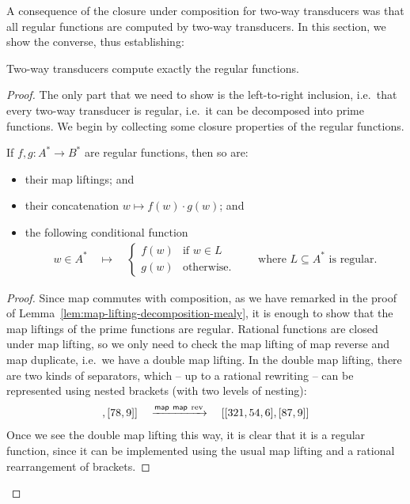 A consequence of the closure under composition for two-way transducers was that all regular functions are computed by two-way transducers. In this section, we show the converse, thus establishing:
\begin{theorem}
    \label{thm:2dfa-decomposition-into-primes}
    Two-way transducers compute exactly the regular functions. 
\end{theorem}
\begin{proof}
    The only part that we need to show is the left-to-right inclusion, i.e.~that every two-way transducer is regular, i.e.~it can be decomposed into prime functions. We begin by collecting some closure properties of the regular functions.
    \begin{lemma}
        \label{lem:regular-closure-properties}
        If $f,g : A^* \to B^*$ are regular functions, then so are: 
        \begin{itemize}
            \item their map liftings; and
            \item their concatenation $w \mapsto f(w)\cdot g(w)$; and
            \item the following conditional function
            \begin{align*}
            w \in A^* \quad \mapsto \quad
            \begin{cases}
                f(w) & \text{if $w \in L$}\\
                g(w) & \text{otherwise.}
            \end{cases}
            \qquad \text{where $L \subseteq A^*$ is regular.}
            \end{align*}
        \end{itemize}
    \end{lemma}
    \begin{proof}
        Since map commutes with composition, as we have remarked in the proof of Lemma~\ref{lem:map-lifting-decomposition-mealy}, it is enough to show that the map liftings of the prime functions are regular. Rational functions are closed under map lifting, so we only need to check the map lifting of map reverse and map duplicate, i.e.~we have a double map lifting. In the double map lifting, there are two kinds of separators, which -- up to a rational rewriting -- can be represented using nested brackets (with two levels of nesting): 
        \begin{align*}
        [[123,45,6],[78,9]] \quad \xrightarrow{\map\  \map\  \text{rev}} \quad [[321,54,6],[87,9]]
        \end{align*}
        Once we see the double map lifting this way, it is clear that it is a regular function, since it can be implemented using the usual map lifting and a rational rearrangement of brackets.


\end{proof}
\end{proof}
